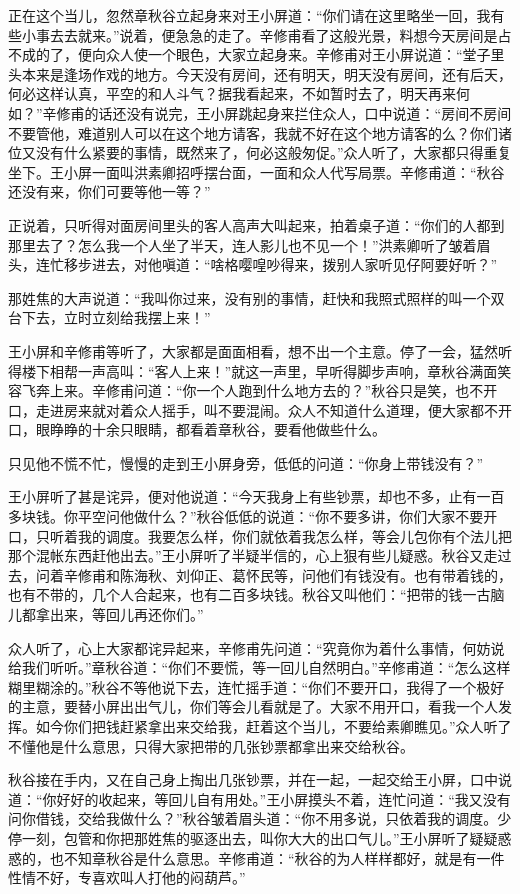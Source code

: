 \documentclass[12pt,UTF8]{ctexbook}
\begin{document}
{{{正在这个当儿，忽然章秋谷立起身来对王小屏道：“你们请在这里略坐一回，我有些小事去去就来。”说着，便急急的走了。辛修甫看了这般光景，料想今天房间是占不成的了，便向众人使一个眼色，大家立起身来。辛修甫对王小屏说道：“堂子里头本来是逢场作戏的地方。今天没有房间，还有明天，明天没有房间，还有后天，何必这样认真，平空的和人斗气？据我看起来，不如暂时去了，明天再来何如？”辛修甫的话还没有说完，王小屏跳起身来拦住众人，口中说道：“房间不房间不要管他，难道别人可以在这个地方请客，我就不好在这个地方请客的么？你们诸位又没有什么紧要的事情，既然来了，何必这般匆促。”众人听了，大家都只得重复坐下。王小屏一面叫洪素卿招呼摆台面，一面和众人代写局票。辛修甫道：“秋谷还没有来，你们可要等他一等？”

正说着，只听得对面房间里头的客人高声大叫起来，拍着桌子道：“你们的人都到那里去了？怎么我一个人坐了半天，连人影儿也不见一个！”洪素卿听了皱着眉头，连忙移步进去，对他嗔道：“啥格嘤喤吵得来，拨别人家听见仔阿要好听？”

那姓焦的大声说道：“我叫你过来，没有别的事情，赶快和我照式照样的叫一个双台下去，立时立刻给我摆上来！”

王小屏和辛修甫等听了，大家都是面面相看，想不出一个主意。停了一会，猛然听得楼下相帮一声高叫：“客人上来！”就这一声里，早听得脚步声响，章秋谷满面笑容飞奔上来。辛修甫问道：“你一个人跑到什么地方去的？”秋谷只是笑，也不开口，走进房来就对着众人摇手，叫不要混闹。众人不知道什么道理，便大家都不开口，眼睁睁的十余只眼睛，都看着章秋谷，要看他做些什么。

只见他不慌不忙，慢慢的走到王小屏身旁，低低的问道：“你身上带钱没有？”

王小屏听了甚是诧异，便对他说道：“今天我身上有些钞票，却也不多，止有一百多块钱。你平空问他做什么？”秋谷低低的说道：“你不要多讲，你们大家不要开口，只听着我的调度。我要怎么样，你们就依着我怎么样，等会儿包你有个法儿把那个混帐东西赶他出去。”王小屏听了半疑半信的，心上狠有些儿疑惑。秋谷又走过去，问着辛修甫和陈海秋、刘仰正、葛怀民等，问他们有钱没有。也有带着钱的，也有不带的，几个人合起来，也有二百多块钱。秋谷又叫他们：“把带的钱一古脑儿都拿出来，等回儿再还你们。”

众人听了，心上大家都诧异起来，辛修甫先问道：“究竟你为着什么事情，何妨说给我们听听。”章秋谷道：“你们不要慌，等一回儿自然明白。”辛修甫道：“怎么这样糊里糊涂的。”秋谷不等他说下去，连忙摇手道：“你们不要开口，我得了一个极好的主意，要替小屏出出气儿，你们等会儿看就是了。大家不用开口，看我一个人发挥。如今你们把钱赶紧拿出来交给我，赶着这个当儿，不要给素卿瞧见。”众人听了不懂他是什么意思，只得大家把带的几张钞票都拿出来交给秋谷。

秋谷接在手内，又在自己身上掏出几张钞票，并在一起，一起交给王小屏，口中说道：“你好好的收起来，等回儿自有用处。”王小屏摸头不着，连忙问道：“我又没有问你借钱，交给我做什么？”秋谷皱着眉头道：“你不用多说，只依着我的调度。少停一刻，包管和你把那姓焦的驱逐出去，叫你大大的出口气儿。”王小屏听了疑疑惑惑的，也不知章秋谷是什么意思。辛修甫道：“秋谷的为人样样都好，就是有一件性情不好，专喜欢叫人打他的闷葫芦。”

}}}
\end{document}
